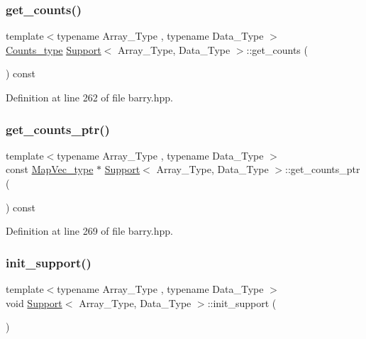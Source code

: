 \subsubsection{\texorpdfstring{get\+\_\+counts()}{get\_counts()}}
{\footnotesize\ttfamily template$<$typename Array\+\_\+\+Type , typename Data\+\_\+\+Type $>$ \\
\hyperlink{namespacebarry_a3e2d8c3b6cf602107559d4237d9f1315}{Counts\+\_\+type} \hyperlink{classbarry_1_1_support}{Support}$<$ Array\+\_\+\+Type, Data\+\_\+\+Type $>$\+::get\+\_\+counts (\begin{DoxyParamCaption}{ }\end{DoxyParamCaption}) const\hspace{0.3cm}{\ttfamily [inline]}}



Definition at line 262 of file barry.\+hpp.

\mbox{\label{classbarry_1_1_support_a170776abc15d0fa8e02df36268e900a7}} 
\subsubsection{\texorpdfstring{get\+\_\+counts\+\_\+ptr()}{get\_counts\_ptr()}}
{\footnotesize\ttfamily template$<$typename Array\+\_\+\+Type , typename Data\+\_\+\+Type $>$ \\
const \hyperlink{namespacebarry_a2f0d3aab1d67e4c8eaeab9022e16139f}{Map\+Vec\+\_\+type} $\ast$ \hyperlink{classbarry_1_1_support}{Support}$<$ Array\+\_\+\+Type, Data\+\_\+\+Type $>$\+::get\+\_\+counts\+\_\+ptr (\begin{DoxyParamCaption}{ }\end{DoxyParamCaption}) const\hspace{0.3cm}{\ttfamily [inline]}}



Definition at line 269 of file barry.\+hpp.

\mbox{\label{classbarry_1_1_support_aef6fda6e7a0989f53fcd252609d770c9}} 
\subsubsection{\texorpdfstring{init\+\_\+support()}{init\_support()}}
{\footnotesize\ttfamily template$<$typename Array\+\_\+\+Type , typename Data\+\_\+\+Type $>$ \\
void \hyperlink{classbarry_1_1_support}{Support}$<$ Array\+\_\+\+Type, Data\+\_\+\+Type $>$\+::init\+\_\+support (\begin{DoxyParamCaption}{ }\end{DoxyParamCaption})\hspace{0.3cm}{\ttfamily [inline]}}




